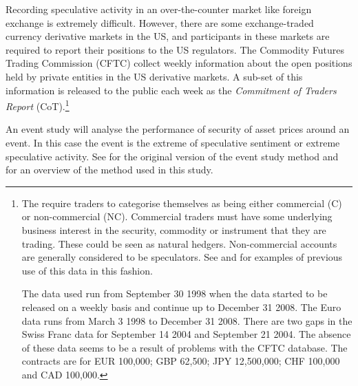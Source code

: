 \documentclass[ijfs,article,submit,oneauthor,pdftex,10pt,a4paper]{mdpi}
\begin{document}
Recording speculative activity in an over-the-counter market like foreign exchange is extremely difficult.  However, there are some exchange-traded currency derivative markets in the US, and participants in these markets are required to report their positions to the US regulators.  The Commodity Futures Trading Commission (CFTC) collect weekly information about the open positions held by private entities in the US derivative markets.   A sub-set of this information is released to the public each week as the \emph{Commitment of Traders Report} (CoT).\footnote{The \citet{cot} require traders to categorise themselves as being either commercial (C) or non-commercial (NC).  Commercial traders must have some underlying business interest in the security, commodity or instrument that they are trading.  These could be seen as natural hedgers.  Non-commercial accounts are generally considered to be speculators.  See \citet{FuturesSanders} and \citet{FuturesWang} for examples of previous use of this data in this fashion.  
 
The data used run from September 30 1998 when the data started to be released on a weekly basis and continue up to December 31 2008.  The Euro data runs from March 3 1998 to December 31 2008.  There are two gaps in the Swiss Franc data for September 14 2004 and September 21 2004.  The absence of these data seems to be a result of problems with the CFTC database.  The contracts are for EUR 100,000; GBP 62,500; JPY 12,500,000; CHF 100,000 and CAD 100,000.}  

An event study will analyse the performance of security of asset prices around an event.  In this case the event is the extreme of speculative sentiment or extreme speculative activity.  See \citet{Dolly1933} for the original version of the event study method and \citet{FamaFisherJensenRoll} for an overview of the method used in this study. 
\end{document}
